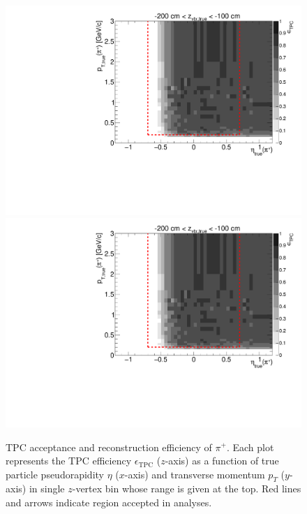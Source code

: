 \begin{figure}[hb]
\caption[TPC acceptance and reconstruction efficiency of $\pi^{+}$.]{TPC acceptance and reconstruction efficiency of $\pi^{+}$. Each plot represents the TPC efficiency $\epsilon_{\text{TPC}}$ ($z$-axis) as a function of true particle pseudorapidity $\eta$ ($x$-axis) and transverse momentum $p_{T}$ ($y$-axis) in single $z$-vertex bin whose range is given at the top. Red lines and arrows indicate region accepted in analyses.}\label{fig:eff_pion_plus}
\centering
\parbox{0.495\textwidth}{
  \centering
  \includegraphics[width=\linewidth,page=3]{graphics/eff/Eff2D_TPC_pion_Plus.pdf}\\
  \includegraphics[width=\linewidth,page=5]{graphics/eff/Eff2D_TPC_pion_Plus.pdf}\\
}
\end{figure}
